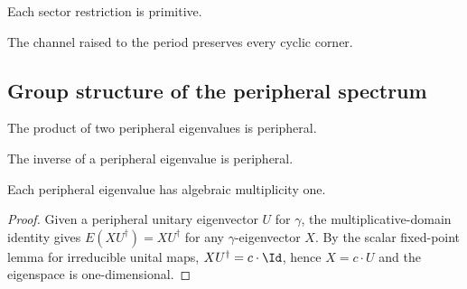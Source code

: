 \begin{lemma}
    \leanok
    Each sector restriction is primitive.
\end{lemma}

\begin{lemma}
    \leanok
    The channel raised to the period preserves every cyclic corner.
\end{lemma}

\subsection{Group structure of the peripheral spectrum}

\begin{lemma}
    \leanok
    The product of two peripheral eigenvalues is peripheral.
\end{lemma}

\begin{lemma}
    \leanok
    The inverse of a peripheral eigenvalue is peripheral.
\end{lemma}

\begin{theorem}
    \label{thm:peripheral_multiplicity_one}
    \leanok
    Each peripheral eigenvalue has algebraic multiplicity one.
\end{theorem}
\begin{proof}\leanok
    Given a peripheral unitary eigenvector $U$ for $\gamma$, the
    multiplicative-domain identity gives $E(X U^\dagger) = X U^\dagger$
    for any $\gamma$-eigenvector $X$. By the scalar fixed-point lemma
    for irreducible unital maps, $X U^\dagger = c \cdot \Id$, hence
    $X = c \cdot U$ and the eigenspace is one-dimensional.
\end{proof}

